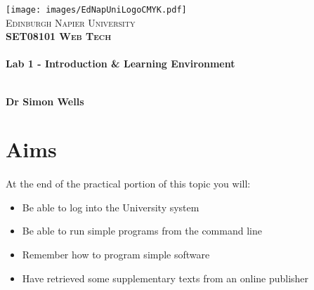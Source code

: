 \documentclass[10pt, a4paper]{article}
\begin{document}

\begin{titlepage}
\vspace*{5cm}
\begin{center}
\texttt{[image: images/EdNapUniLogoCMYK.pdf]}~\\[1cm]

\textsc{\Large Edinburgh Napier University}\\[1.5cm]

\textsc{\LARGE \bfseries SET08101 Web Tech}\\[0.5cm]

\hrulefill \\[0.4cm]
{\huge \bfseries Lab 1 - Introduction \& Learning Environment \\[0.4cm] }
\hrulefill \\[1.5cm]

\begin{minipage}{0.4\textwidth}
\begin{flushleft} \large
\textbf{Dr Simon Wells} \\
\end{flushleft}
\end{minipage}

\vfill

\end{center}
\end{titlepage}




%

\section{Aims}
\paragraph{} At the end of the practical portion of this topic you will:

\begin{itemize}
\item Be able to log into the University system
\item Be able to run simple programs from the command line
\item Remember how to program simple software
\item Have retrieved some supplementary texts from an online publisher
\end{itemize}
\end{document}
